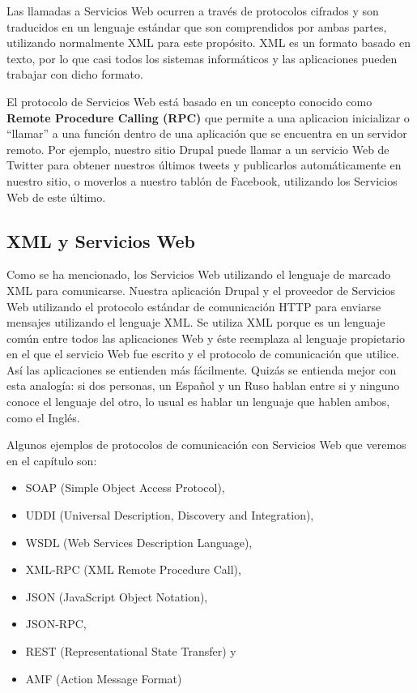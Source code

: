 Las llamadas a Servicios Web ocurren a través de protocolos cifrados y son traducidos en un lenguaje
estándar que son comprendidos por ambas partes, utilizando normalmente XML para este propósito. 
XML es un formato basado en texto, por lo que casi todos los sistemas informáticos y las aplicaciones 
pueden trabajar con dicho formato.

El protocolo de Servicios Web está basado en un concepto conocido como \textbf{Remote Procedure Calling (RPC)}
que permite a una aplicacion inicializar o ``llamar'' a una función dentro de una aplicación que se 
encuentra en un servidor remoto. Por ejemplo, nuestro sitio Drupal puede llamar a un servicio Web de 
Twitter para obtener nuestros últimos tweets y publicarlos automáticamente en nuestro sitio, o 
moverlos a nuestro tablón de Facebook, utilizando los Servicios Web de este último.

\subsection{XML y Servicios Web}

Como se ha mencionado, los Servicios Web utilizando el lenguaje de marcado XML para comunicarse.
Nuestra aplicación Drupal y el proveedor de Servicios Web utilizando el protocolo estándar de comunicación 
HTTP para enviarse mensajes utilizando el lenguaje XML. Se utiliza XML porque es un lenguaje común entre 
todos las aplicaciones Web y éste reemplaza al lenguaje propietario en el que el servicio Web fue escrito
y el protocolo de comunicación que utilice. Así las aplicaciones se entienden más fácilmente. Quizás se 
entienda mejor con esta analogía: si dos personas, un Español y un Ruso hablan entre si y ninguno conoce 
el lenguaje del otro, lo usual es hablar un lenguaje que hablen ambos, como el Inglés. 

Algunos ejemplos de protocolos de comunicación con Servicios Web que veremos en el capítulo son:
\begin{itemize}
  \item SOAP (Simple Object Access Protocol), 
  \item UDDI (Universal Description, Discovery and Integration),
  \item WSDL (Web Services Description Language),
  \item XML-RPC (XML Remote Procedure Call),
  \item JSON (JavaScript Object Notation),
  \item JSON-RPC,
  \item REST (Representational State Transfer) y
  \item AMF (Action Message Format)  
\end{itemize} 

